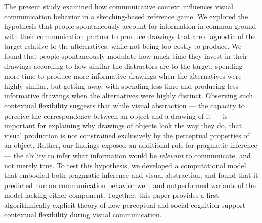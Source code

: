 \documentclass[9pt,twocolumn,twoside]{pnas-new}
\begin{document}
The present study examined how communicative context influences visual communication behavior in a sketching-based reference game. 
We explored the hypothesis that people spontaneously account for information in common ground with their communication partner to produce drawings that are diagnostic of the target relative to the alternatives, while not being too costly to produce. 
We found that people spontaneously modulate how much time they invest in their drawings according to how similar the distractors are to the target, spending more time to produce more informative drawings when the alternatives were highly similar, but getting away with spending less time and producing less informative drawings when the alternatives were highly distinct.
Observing such contextual flexibility suggests that while visual abstraction --- the capacity to perceive the correspondence between an object and a drawing of it --- is important for explaining why drawings of objects look the way they do, that visual production is not constrained exclusively by the perceptual properties of an object.  
Rather, our findings exposed an additional role for pragmatic inference --- the ability to infer what information would be \textit{relevant} to communicate, and not merely true.
To test this hypothesis, we developed a computational model that embodied both pragmatic inference and visual abstraction, and found that it predicted human communication behavior well, and outperformed variants of the model lacking either component. 
Together, this paper provides a first algorithmically explicit theory of how perceptual and social cognition support contextual flexibility during visual communication.
\end{document}
